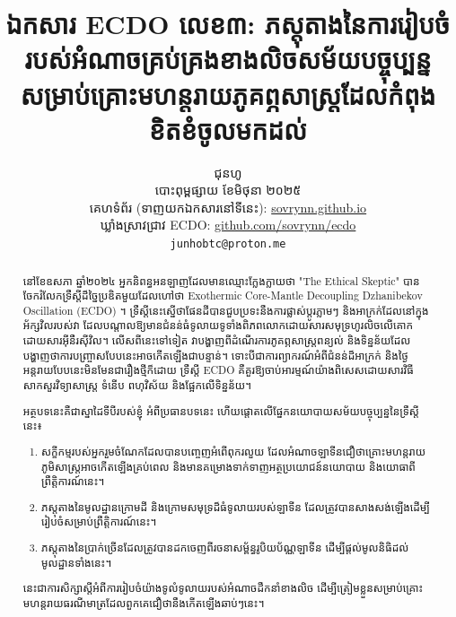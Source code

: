 \documentclass[10pt,twocolumn,letterpaper]{article}
\begin{document}
\title{ឯកសារ ECDO លេខ៣: ភស្តុតាងនៃការរៀបចំរបស់អំណាចគ្រប់គ្រងខាងលិចសម័យបច្ចុប្បន្នសម្រាប់គ្រោះមហន្តរាយភូគព្ភសាស្ត្រដែលកំពុងខិតខំចូលមកដល់}

\author{ជុនហូ\\
បោះពុម្ពផ្សាយ ខែមិថុនា ២០២៥\\
គេហទំព័រ (ទាញយកឯកសារនៅទីនេះ): \href{https://sovrynn.github.io}{sovrynn.github.io}\\
ឃ្លាំងស្រាវជ្រាវ ECDO: \href{https://github.com/sovrynn/ecdo}{github.com/sovrynn/ecdo}\\
{\tt\small junhobtc@proton.me}
}
\maketitle

\begin{abstract}
នៅខែឧសភា ឆ្នាំ២០២៤ អ្នកនិពន្ធអនឡាញដែលមានឈ្មោះក្លែងក្លាយថា "The Ethical Skeptic" \cite{0} បានចែករំលែកទ្រឹស្ដីដ៏ច្នៃប្រឌិតមួយដែលហៅថា Exothermic Core-Mantle Decoupling Dzhanibekov Oscillation (ECDO) \cite{1}។ ទ្រឹស្ដីនេះស្នើថាផែនដីបានជួបប្រទះនឹងការផ្លាស់ប្តូរភ្លាមៗ និងអាក្រក់ដែលនៅក្នុងអ័ក្សវិលរបស់វា ដែលបណ្តាលឱ្យមានជំនន់ធំទូលាយទូទាំងពិភពលោកដោយសារសមុទ្រហូរលិចលើគោកដោយសារអ៊ីនឺរស៊ីវិល។ លើសពីនេះទៅទៀត វាបង្ហាញពីដំណើរការភូគព្ភសាស្ត្រពន្យល់ និងទិន្នន័យដែលបង្ហាញថាការបញ្ច្រាសបែបនេះអាចកើតឡើងជាបន្ទាន់។ ទោះបីជាការព្យាករណ៍អំពីជំនន់ដ៏អាក្រក់ និងថ្ងៃអន្តរាយបែបនេះមិនមែនជារឿងថ្មីក៏ដោយ ទ្រឹស្ដី ECDO គឺគួរឱ្យចាប់អារម្មណ៍យ៉ាងពិសេសដោយសារវិធីសាកសួរវិទ្យាសាស្ត្រ ទំនើប ពហុវិស័យ និងផ្អែកលើទិន្នន័យ។

អត្ថបទនេះគឺជាស្នាដៃទីបីរបស់ខ្ញុំ \cite{2,3} អំពីប្រធានបទនេះ ហើយផ្តោតលើផ្នែកនយោបាយសម័យបច្ចុប្បន្ននៃទ្រឹស្ដីនេះ៖
\begin{flushleft}
\begin{enumerate}
    \item សក្ខីកម្មរបស់អ្នករួមចំណែកដែលបានបញ្ចេញអំពើពុករលួយ ដែលអំណាចឡាទីនជឿថាគ្រោះមហន្តរាយភូមិសាស្ត្រអាចកើតឡើងគ្រប់ពេល និងមានគម្រោងទាក់ទាញអត្ថប្រយោជន៍នយោបាយ និងយោធាពីព្រឹត្តិការណ៍នេះ។
    \item ភស្តុតាងនៃមូលដ្ឋានក្រោមដី និងក្រោមសមុទ្រដ៏ធំទូលាយរបស់ឡាទីន ដែលត្រូវបានសាងសង់ឡើងដើម្បីរៀបចំសម្រាប់ព្រឹត្តិការណ៍នេះ។
    \item ភស្តុតាងនៃប្រាក់ច្រើនដែលត្រូវបានដកចេញពីរចនាសម្ព័ន្ធរូបិយប័ណ្ណឡាទីន ដើម្បីផ្តល់មូលនិធិដល់មូលដ្ឋានទាំងនេះ។
\end{enumerate}
\end{flushleft}
នេះជាការសិក្សាស្ដីអំពីការរៀបចំយ៉ាងទូលំទូលាយរបស់អំណាចដឹកនាំខាងលិច ដើម្បីត្រៀមខ្លួនសម្រាប់គ្រោះមហន្តរាយធរណីមាត្រដែលពួកគេជឿថានឹងកើតឡើងឆាប់ៗនេះ។
\end{abstract}
\end{document}
